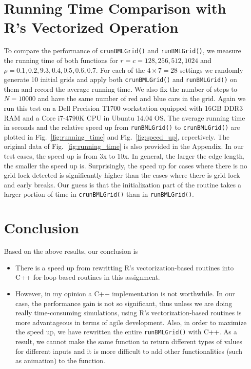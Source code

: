 \documentclass{article}
\begin{document}
\section{Running Time Comparison with R's Vectorized Operation}
To compare the performance of \texttt{crunBMLGrid()} and \texttt{runBMLGrid()},
we measure the running time of both functions for $r=c=128,256,512,1024$ and
$\rho=0.1,0.2,9.3,0.4,0.5,0.6,0.7$. For each of the $4\times7=28$ settings we
randomly generate 10 initial grids and apply both \texttt{crunBMLGrid()} and
\texttt{runBMLGrid()} on them and record the average running time. We also fix
the number of steps to $N=10000$ and have the same number of red and blue cars
in the grid. Again we run this test on a Dell Precision T1700 workstation
equipped with 16GB DDR3 RAM and a Core i7-4790K CPU in Ubuntu 14.04 OS. The
average running time in seconds and the relative speed up from
\texttt{runBMLGrid()} to \texttt{crunBMLGrid()} are plotted in Fig.~\ref{fig:running_time}
and Fig.~\ref{fig:speed_up}, repectively. The original data of
Fig.~\ref{fig:running_time} is also provided in the Appendix. In our test cases,
the speed up is from 3x to 10x. In general, the larger the edge length, the
smaller the speed up is. Surprisingly, the speed up for cases where there is no
grid lock detected is significantly higher than the cases where there is grid lock
and early breaks. Our guess is that the initialization part of the routine takes
a larger portion of time in \texttt{crunBMLGrid()} than in
\texttt{runBMLGrid()}.

\section{Conclusion}
Based on the above results, our conclusion is
\begin{itemize}
    \item There is a speed up from rewritting R's vectorization-based
    routines into C++ for-loop based routines in this assignment.
    \item However, in my opinion a C++ implementation is not worthwhile. In our
    case, the performance gain is not so significant, thus unless we are doing
    really time-consuming simulations, using R's vectorization-based
    routines is more advantageous in terms of agile development. Also, in order
    to maximize the speed up, we have rewritten the entire \texttt{runBMLGrid()}
    with C++. As a result, we cannot make the same function to return different
    types of values for different inputs and it is more difficult to add other
    functionalities (such as animation) to the function.
\end{itemize}
\end{document}
